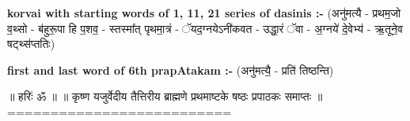 \documentclass[17pt]{extarticle}
\begin{document}
        \textbf{korvai with starting words of 1, 11, 21 series of dasinis :-} \newline
        (अनु॑मत्यै - प्रथम॒जो व॒थ्सो - ब॑हुरू॒पा हि प॒शव॒ - स्तस्मा᳚त् पृथमा॒त्रं - ॅयद॒ग्नयेऽनी॑कवत - उद्धा॒रं ॅवा - अ॒ग्नये॑ दे॒वेभ्य॑ - ऋ॒तूने॒व षट्थ्स॑प्ततिः) \newline

        \textbf{first and last  word of 6th prapAtakam :-} \newline
        (अनु॑मत्यै॒ - प्रति॑ तिष्ठन्ति) \newline 

       

        ॥ हरिः॑ ॐ ॥
॥ कृष्ण यजुर्वेदीय तैत्तिरीय ब्राह्मणे प्रथमाष्टके षष्ठः प्रपाठकः समाप्तः ॥
========================== \newline
        \pagebreak
        
        
        
\end{document}
